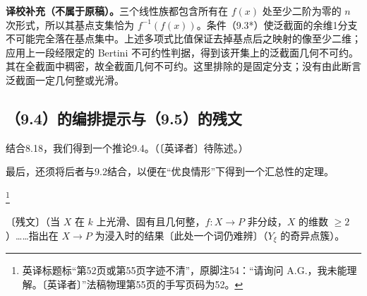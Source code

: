 \noindent\textbf{译校补充（不属于原稿）。}三个线性族都包含所有在 $f(x)$ 处至少二阶为零的 $n$ 次形式，所以其基点支集恰为 $f^{-1}(f(x))$。条件（9.3*）使泛截面的余维1分支不可能完全落在基点集中。上述多项式比值保证去掉基点后之映射的像至少二维；应用上一段经限定的 Bertini 不可约性判据，得到该开集上的泛截面几何不可约。其在全截面中稠密，故全截面几何不可约。这里排除的是固定分支；没有由此断言泛截面一定几何整或光滑。

\subsection*{（9.4）的编排提示与（9.5）的残文}
结合8.18，我们得到一个推论9.4。（〔英译者〕待陈述。）

最后，还须将后者与9.2结合，以便在“优良情形”下得到一个汇总性的定理。

\footnote{英译标题标“第52页或第55页字迹不清”，原脚注54：“请询问 A.G.，我未能理解。〔英译者〕”法稿物理第55页的手写页码为52。}

〔残文〕（当 $X$ 在 $k$ 上光滑、固有且几何整，$f:X\to P$ 非分歧，$X$ 的维数 $\ge2$）……指出在 $X\to P$ 为浸入时的结果〔此处一个词仍难辨〕（$Y_\xi$ 的奇异点簇）。
